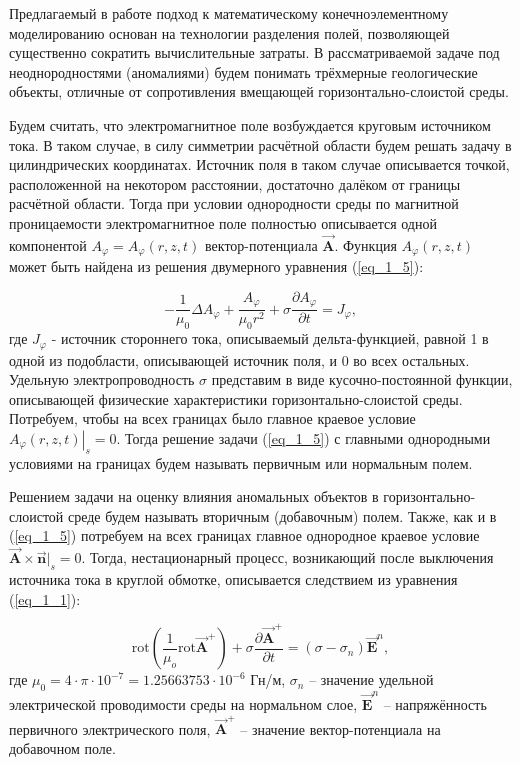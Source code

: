 Предлагаемый в работе подход к математическому конечноэлементному моделированию основан на технологии разделения полей, позволяющей существенно сократить вычислительные затраты. В рассматриваемой задаче под неоднородностями (аномалиями) будем понимать трёхмерные геологические объекты, отличные от сопротивления вмещающей горизонтально-слоистой среды.

Будем считать, что электромагнитное поле возбуждается круговым источником тока. В таком случае, в силу симметрии расчётной области будем решать задачу в цилиндрических координатах. Источник поля в таком случае описывается точкой, расположенной на некотором расстоянии, достаточно далёком от границы расчётной области. Тогда при условии однородности среды по магнитной проницаемости электромагнитное поле полностью описывается одной компонентой $A_{\varphi} = A_{\varphi}(r, z, t)$ вектор-потенциала $\overrightarrow{\textbf{A}}$. Функция $A_{\varphi}(r, z, t)$ может быть найдена из решения двумерного уравнения (\ref{eq_1_5}):

\begin{equation} \label{eq_1_5}
	-\frac{1}{\mu_0} \Delta A_{\varphi} + \frac{A_{\varphi}}{\mu_0 r^2} + \sigma \frac{\partial A_{\varphi}}{\partial t} = J_{\varphi},
\end{equation}
где $J_{\varphi}$ - источник стороннего тока, описываемый дельта-функцией, равной 1 в одной из подобласти, описывающей источник поля, и 0 во всех остальных. Удельную электропроводность $\sigma$ представим в виде кусочно-постоянной функции, описывающей физические характеристики горизонтально-слоистой среды. Потребуем, чтобы на всех границах было главное краевое условие $\left.A_{\varphi}(r, z, t)\right|_s = 0$. Тогда решение задачи (\ref{eq_1_5}) с главными однородными условиями на границах будем называть первичным или нормальным полем.

Решением задачи на оценку влияния аномальных объектов в горизонтально-слоистой среде будем называть вторичным (добавочным) полем. Также, как и в (\ref{eq_1_5}) потребуем на всех границах главное однородное краевое условие $\overrightarrow{\textbf{A}} \times \overrightarrow{\textbf{n}} |_s = 0$. Тогда, нестационарный процесс, возникающий после выключения источника тока в круглой обмотке, описывается следствием из уравнения (\ref{eq_1_1}):

\begin{equation} \label{eq_1_6}
	\text{rot} \left( \frac{1}{\mu_o} \text{rot} \overrightarrow{\textbf{A}}^{+} \right) + \sigma \frac{\partial \overrightarrow{\textbf{A}}^{+}}{\partial t} = (\sigma - \sigma_n) \overrightarrow{\textbf{E}}^n,
\end{equation}
где $\mu_0 = 4 \cdot \pi \cdot 10^{-7} = 1.25663753 \cdot 10^{-6}$ Гн/м, $\sigma_n$ -- значение удельной электрической проводимости среды на нормальном слое, $\overrightarrow{\textbf{E}}^n$ -- напряжённость первичного электрического поля, $\overrightarrow{\textbf{A}}^{+}$ -- значение вектор-потенциала на добавочном поле.

